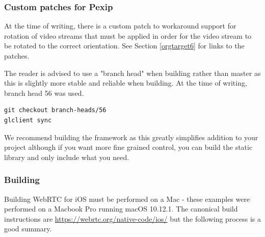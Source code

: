 \documentclass[a4paper,11pt]{article}
\begin{document}
\subsubsection{Custom patches for Pexip}
\label{sec:orgheadline39}

At the time of writing, there is a custom patch to workaround support
for rotation of video streams that must be applied in order for the
video stream to be rotated to the correct orientation.  See Section
\ref{orgtarget6} for links to the patches.

The reader is advised to use a "branch head" when building rather than
master as this is slightly more stable and reliable when building.  At
the time of writing, branch head 56 was used.

\begin{verbatim}
git checkout branch-heads/56
glclient sync
\end{verbatim}

We recommend building the framework as this greatly simplifies
addition to your project although if you want more fine grained
control, you can build the static library and only include what you
need.

\subsubsection{Building}
\label{sec:orgheadline47}

Building WebRTC for iOS must be performed on a Mac - these examples
were performed on a Macbook Pro running macOS 10.12.1.  The canonical
build instructions are \url{https://webrtc.org/native-code/ios/} but the
following process is a good summary.
\end{document}
